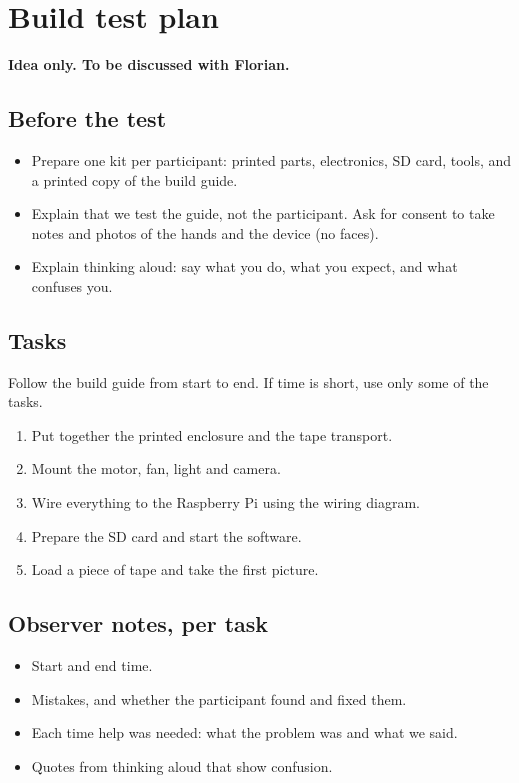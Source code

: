 \chapter{Build test plan}\label{app:build-test}

\begin{planned}
\textbf{Idea only. To be discussed with Florian.}

\section*{Before the test}
\begin{itemize}
  \item Prepare one kit per participant: printed parts, electronics, SD card, tools, and a
  printed copy of the build guide.
  \item Explain that we test the guide, not the participant. Ask for consent to take notes and
  photos of the hands and the device (no faces).
  \item Explain thinking aloud: say what you do, what you expect, and what confuses you.
\end{itemize}

\section*{Tasks}
Follow the build guide from start to end. If time is short, use only some of the tasks.
\begin{enumerate}
  \item Put together the printed enclosure and the tape transport.
  \item Mount the motor, fan, light and camera.
  \item Wire everything to the Raspberry Pi using the wiring diagram.
  \item Prepare the SD card and start the software.
  \item Load a piece of tape and take the first picture.
\end{enumerate}

\section*{Observer notes, per task}
\begin{itemize}
  \item Start and end time.
  \item Mistakes, and whether the participant found and fixed them.
  \item Each time help was needed: what the problem was and what we said.
  \item Quotes from thinking aloud that show confusion.
\end{itemize}


\end{planned}
